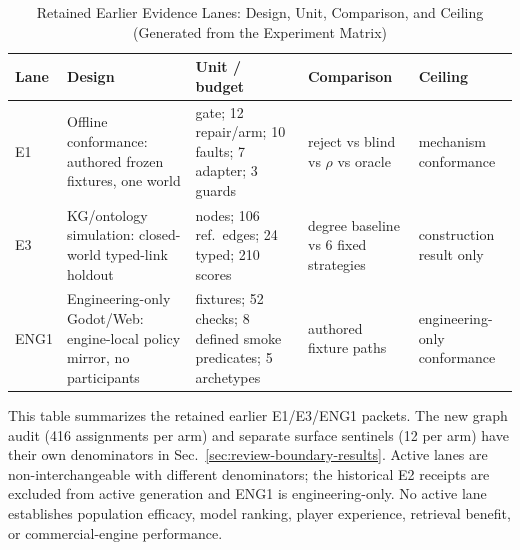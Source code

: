 \begin{table}[t]
\caption{Retained Earlier Evidence Lanes: Design, Unit, Comparison, and Ceiling (Generated from the Experiment Matrix)}
\label{tab:evidence-lanes}
\centering\scriptsize
\setlength{\tabcolsep}{4pt}
\renewcommand{\arraystretch}{1.20}
\begin{tabularx}{\columnwidth}{@{}l>{\raggedright\arraybackslash}X>{\raggedright\arraybackslash}p{}>{\raggedright\arraybackslash}p{}>{\raggedright\arraybackslash}p{}@{}}
\toprule
\textbf{Lane} & \textbf{Design} & \textbf{Unit / budget} & \textbf{Comparison} & \textbf{Ceiling} \\
\midrule
E1 & Offline conformance: authored frozen fixtures, one world & 13 gate; 12 repair/arm; 10 faults; 7 adapter; 3 guards & reject vs blind vs $\rho$ vs oracle & mechanism conformance \\
E3 & KG/ontology simulation: closed-world typed-link holdout & 43 nodes; 106 ref.\ edges; 24 typed; 210 scores & degree baseline vs 6 fixed strategies & construction result only \\
ENG1 & Engineering-only Godot/Web: engine-local policy mirror, no participants & 4 fixtures; 52 checks; 8 defined smoke predicates; 5 archetypes & authored fixture paths & engineering-only conformance \\
\bottomrule
\end{tabularx}
\par\vspace{3pt}\noindent\parbox{0.96\columnwidth}{\scriptsize This table summarizes the retained earlier E1/E3/ENG1 packets. The new graph audit (416 assignments per arm) and separate surface sentinels (12 per arm) have their own denominators in Sec.~\ref{sec:review-boundary-results}. Active lanes are non-interchangeable with different denominators; the historical E2 receipts are excluded from active generation and ENG1 is engineering-only. No active lane establishes population efficacy, model ranking, player experience, retrieval benefit, or commercial-engine performance.}
\end{table}
